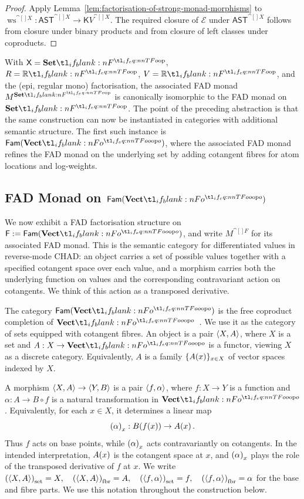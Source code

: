 \documentclass[11pt,a4paper]{article}
\theoremstyle{definition}
\theoremstyle{remark}
\providecommand{\AST}{\mathsf{AST}}
\providecommand{\Fam}[1]{\mathsf{Fam}(#1)}
\providecommand{\base}[1]{\left(#1\right)_{\mathrm{set}}}
\providecommand{\fibr}[1]{\left(#1\right)_{\mathrm{fbr}}}
\providecommand{\ws}{\operatorname{ws}}
\providecommand{\cont}{\mathsf{K}}
\begin{document}
\begin{proof}
	Apply Lemma~\ref{lem:factorisation-of-strong-monad-morphisms} to
	\( \ws^{\cat[]{X}}:\AST^{\cat[]{X}}\to\cont{V}^{\cat[]{X}} \). The required
	closure of \( \mathcal{E} \) under \( \AST^{\cat[]{X}} \) follows from
	closure under binary products and from closure of left classes under
	coproducts.
\end{proof}


With \( \cat[]{X}=\Set \), \(R=\R\), \(V=\R\), and the
(epi, regular mono) factorisation, the associated FAD monad
\(M^{\Set}\) is canonically isomorphic to the FAD monad on \( \Set \). The
point of the preceding abstraction is that the same construction can now be
instantiated in categories with additional semantic structure. The first
such instance is \( \Fam{\Vect[o]} \), where the associated FAD monad refines
the FAD monad on the underlying set by adding cotangent fibres for atom
locations and log-weights.

\subsection{FAD Monad on \texorpdfstring{\( \Fam{\Vect[o]} \)}{Fam(VectOp)}}
\label{sec:fad-monad-on-fam-vectop}

We now exhibit a FAD factorisation structure on
\( \cat[]{F}:=\Fam{\Vect[o]} \), and write \(M^{\cat[]{F}}\) for its associated
FAD monad. This is the semantic category for differentiated values in
reverse-mode CHAD: an object carries a set of possible values together with a
specified cotangent space over each value, and a morphism carries both the
underlying function on values and the corresponding contravariant action on
cotangents.
We think of this action as a transposed derivative.

The category \( \Fam{\Vect[o]} \) is the free coproduct completion of
\( \Vect[o] \)~\cite{adamekHowNiceAre2020}. We use it as the category of sets
equipped with cotangent fibres. An object is a pair \( \left\langle X,A\right\rangle \), where
\(X\) is a set and \(A:X\to\Vect[o]\) is a functor, viewing \(X\) as a
discrete category. Equivalently, \(A\) is a family
\( \{\Fun[np]{A}{x}\}_{x\in X} \) of vector spaces indexed by \(X\).

A morphism \( \left\langle X,A\right\rangle\to\left\langle Y,B\right\rangle \) is a pair
\( \left\langle f,\alpha\right\rangle \), where \(f:X\to Y\) is a function and
\( \alpha:A\to B\circ f \) is a natural transformation in \( \Vect[o] \).
Equivalently, for each \(x\in X\), it determines a linear map
\[
\Nat[nn]{\alpha}{x}:
\Fun[np]{B}{\fn[n]{f}{x}}
\to
\Fun[np]{A}{x}.
\]
Thus \(f\) acts on base points, while \( \Nat[nn]{\alpha}{x} \) acts
contravariantly on cotangents. In the intended interpretation,
\( \Fun[np]{A}{x} \) is the cotangent space at \(x\), and
\( \Nat[nn]{\alpha}{x} \) plays the role of the transposed derivative of \(f\)
at \(x\). We write
\(
\base{\tuple{X,A}}=X,
\quad
\fibr{\tuple{X,A}}=A,
\quad
\base{\tuple{f,\alpha}}=f,
\quad
\fibr{\tuple{f,\alpha}}=\alpha
\)
for the base and fibre parts. We use this notation throughout the
construction below.
\end{document}
